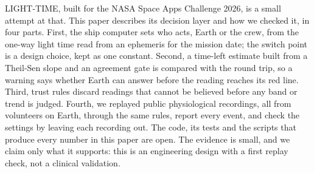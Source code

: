 LIGHT-TIME, built for the NASA Space Apps Challenge 2026, is a small attempt at that. This paper describes its decision layer and how we checked it, in four parts. First, the ship computer sets who acts, Earth or the crew, from the one-way light time read from an ephemeris for the mission date; the switch point is a design choice, kept as one constant. Second, a time-left estimate built from a Theil-Sen slope and an agreement gate is compared with the round trip, so a warning says whether Earth can answer before the reading reaches its red line. Third, trust rules discard readings that cannot be believed before any band or trend is judged. Fourth, we replayed public physiological recordings, all from volunteers on Earth, through the same rules, report every event, and check the settings by leaving each recording out. The code, its tests and the scripts that produce every number in this paper are open. The evidence is small, and we claim only what it supports: this is an engineering design with a first replay check, not a clinical validation.
